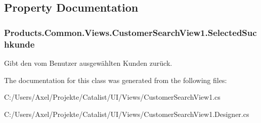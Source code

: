 \subsection{Property Documentation}
\subsubsection[{\texorpdfstring{Selected\+Suchkunde}{SelectedSuchkunde}}]{ Products.\+Common.\+Views.\+Customer\+Search\+View1.\+Selected\+Suchkunde\hspace{0.3cm}{\ttfamily [get]}}\hypertarget{class_products_1_1_common_1_1_views_1_1_customer_search_view1_acc550bb32a8c1befc5582374a670fdcf}{}\label{class_products_1_1_common_1_1_views_1_1_customer_search_view1_acc550bb32a8c1befc5582374a670fdcf}


Gibt den vom Benutzer ausgewählten Kunden zurück. 



The documentation for this class was generated from the following files\+:\begin{DoxyCompactItemize}
\item 
C\+:/\+Users/\+Axel/\+Projekte/\+Catalist/\+U\+I/\+Views/Customer\+Search\+View1.\+cs\item 
C\+:/\+Users/\+Axel/\+Projekte/\+Catalist/\+U\+I/\+Views/Customer\+Search\+View1.\+Designer.\+cs\end{DoxyCompactItemize}
